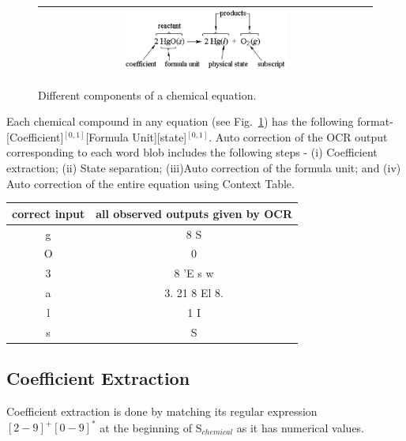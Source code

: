 \documentclass[oneside,a4paper,12pt]{book}
\begin{document}
\begin{figure}[!htb]
\center\ 
\begin{tabular}{|c|} 
\hline
\includegraphics[width=0.5\textwidth]{chemEqParts.png}\\
\hline
\end{tabular} 
\caption{Different components of a chemical equation. }
\label{chemEqParts} 
\end{figure}  

 Each chemical compound in any equation (see Fig.~\ref{chemEqParts}) has the following format- [Coefficient]$^{[0,1]}$[Formula Unit][state]$^{[0,1]}$. Auto correction of the OCR output corresponding to each word blob includes the following steps - (i) Coefficient extraction; (ii) State separation; (iii)Auto correction of the formula unit; and (iv) Auto correction of the entire equation using Context Table.



\begin{table}[!htb]
\begin{center}
 \begin{tabular}{|| c | c ||}
 \hline
 correct input & all observed outputs given by OCR\\
 \hline
 g & 8 S\\
 \hline
O & 0\\
\hline
3 & 8 'E s w \\
\hline
a & 3. 21 8 El 8. \\
\hline
l & 1 I\\
\hline
s & S\\
 \hline
 \end{tabular}
 \end{center}
 \label{table:errorTable}
 \end{table}




\subsection{Coefficient Extraction}

Coefficient extraction is done by matching its regular expression $[2-9]^{+}[0-9]^{*}$ at the beginning of S$_{chemical}$ as it has numerical values. 
\end{document}
